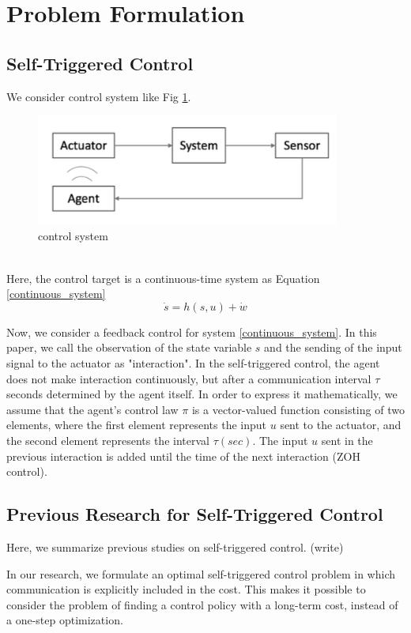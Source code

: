\documentclass[english, dvipdfmx]{ampmt}             %
\begin{document}
\section{Problem Formulation}
\subsection{Self-Triggered Control}
We consider control system like Fig \ref{image}.
\begin{figure}[h]
	\centering
 	\includegraphics[width=10cm]{event.png}
 	\caption{control system} \label{image}
\end{figure}\\
Here, the control target is a continuous-time system as Equation \eqref{continuous_system}
\begin{equation}
	\dot{s} = h(s,u) + \dot{w}\label{continuous_system}
\end{equation}\par
Now, we consider a feedback control for system \eqref{continuous_system}. In this paper, we call the observation of the state variable $s$ and the sending of the input signal to the actuator as "interaction". In the self-triggered control, the agent does not make interaction continuously, but after a communication interval $\tau$ seconds determined by the agent itself. In order to express it mathematically, we assume that the agent's control law $\pi$ is a vector-valued function consisting of two elements, where the first element represents the input $u$ sent to the actuator, and the second element represents the interval $\tau (sec)$. The input $u$ sent in the previous interaction is added until the time of the next interaction (ZOH control).

\subsection{Previous Research for Self-Triggered Control}
Here, we summarize previous studies on self-triggered control. 
(write)\par
In our research, we formulate an optimal self-triggered control problem in which communication is explicitly included in the cost. This makes it possible to consider the problem of finding a control policy with a long-term cost, instead of a one-step optimization.
\end{document}
